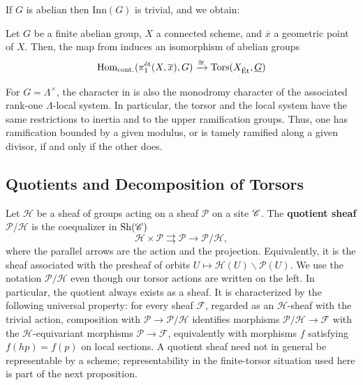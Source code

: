 If $G$ is abelian then $\mathrm{Inn}(G)$ is trivial, and we obtain:
\begin{cor}\label{cor:abelian_equivilance_fundamental_torsors}
    Let $G$ be a finite abelian group, $X$ a connected scheme, and $\overline{x}$ a geometric point of $X$. Then, the map from 
     induces an isomorphism of abelian groups
    \begin{equation}
        \mathrm{Hom}_{\mathrm{cont.}}(\pi_1^{\text{ét}}(X, \overline{x}), G) \xrightarrow{\cong} \operatorname{Tors}(X_{\text{\'Et}}, \underline{G})
    \end{equation}
\end{cor}

For $G=\Lambda^\times$, the character in
 is also the monodromy
character of the associated rank-one $\Lambda$-local system. In particular,
the torsor and the local system have the same restrictions to inertia and to
the upper ramification groups. Thus, one has ramification bounded by a given
modulus, or is tamely ramified along a given divisor, if and only if the other
does.

\subsection*{Quotients and Decomposition of Torsors}

Let $\mathcal{H}$ be a sheaf of groups acting on a sheaf $\mathcal{P}$ on a
site $\mathscr{C}$. The \textbf{quotient sheaf} $\mathcal{P}/\mathcal{H}$ is the
coequalizer in $\operatorname{Sh}(\mathscr{C})$
\[
\mathcal{H}\times\mathcal{P}
\rightrightarrows
\mathcal{P}\longrightarrow\mathcal{P}/\mathcal{H},
\]
where the parallel arrows are the action and the projection.
Equivalently, it is the sheaf associated with the presheaf of orbits
$U\mapsto\mathcal{H}(U)\backslash\mathcal{P}(U)$. We use the notation
$\mathcal{P}/\mathcal{H}$ even though our torsor actions are written on the
left. In particular, the quotient always exists as a sheaf. It is
characterized by the following universal property:
for every sheaf $\mathcal{F}$, regarded as an $\mathcal{H}$-sheaf with the
trivial action, composition with
$\mathcal{P}\to\mathcal{P}/\mathcal{H}$ identifies morphisms
$\mathcal{P}/\mathcal{H}\to\mathcal{F}$ with the
$\mathcal{H}$-equivariant morphisms $\mathcal{P}\to\mathcal{F}$, equivalently
with morphisms $f$ satisfying $f(hp)=f(p)$ on local sections. A quotient
sheaf need not in general be representable by a scheme; representability in
the finite-torsor situation used here is part of the next proposition.

